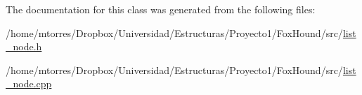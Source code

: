 The documentation for this class was generated from the following files\-:\begin{DoxyCompactItemize}
\item 
/home/mtorres/\-Dropbox/\-Universidad/\-Estructuras/\-Proyecto1/\-Fox\-Hound/src/\hyperlink{list__node_8h}{list\-\_\-node.\-h}\item 
/home/mtorres/\-Dropbox/\-Universidad/\-Estructuras/\-Proyecto1/\-Fox\-Hound/src/\hyperlink{list__node_8cpp}{list\-\_\-node.\-cpp}\end{DoxyCompactItemize}
